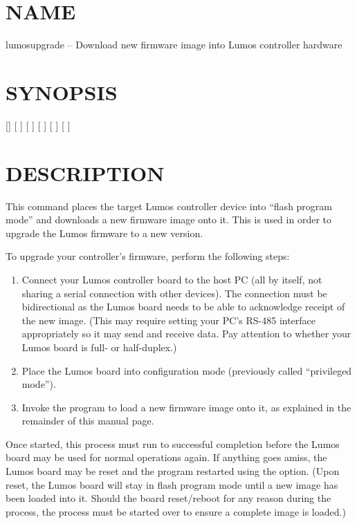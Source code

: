 \section*{NAME}
lumosupgrade -- Download new firmware image into Lumos controller hardware
\section*{SYNOPSIS}
[]
[
]
[
]
[
]
[
]
[
]
\section*{DESCRIPTION}


This command places the target Lumos controller device into
``flash program mode'' and downloads a new firmware image
onto it.  This is used in order to upgrade the Lumos firmware
to a new version.


To upgrade your controller's firmware, perform the following steps:
\begin{enumerate}
\item
Connect your Lumos controller board to the host PC (all by itself,
not sharing a serial connection with other devices). The connection
must be bidirectional as the Lumos board needs to be able to acknowledge
receipt of the new image.  (This may require setting your PC's RS-485 
interface appropriately so it may send and receive data.  Pay attention
to whether your Lumos board is full- or half-duplex.)
\item
Place the Lumos board into configuration mode (previously called
``privileged mode'').
\item
Invoke the
program to load a new firmware image onto it, as explained in
the remainder of this manual page.
\end{enumerate}


Once started, this process must run to successful completion
before the Lumos board may be used for normal operations again.
If anything goes amiss, the Lumos board may be reset and the 
program restarted using the
option.  (Upon reset, the Lumos board will stay in
flash program mode until a new image has been loaded into it.  Should the
board reset/reboot for any reason during the process, the 
process must be started over to ensure a complete image is loaded.)
